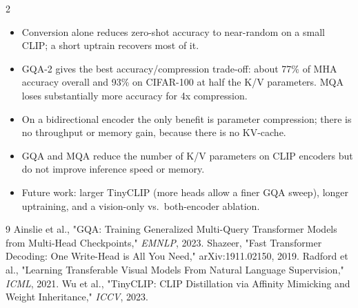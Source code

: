 \documentclass[a0,portrait]{a0poster}
\begin{document}
\begin{multicols}{2}
\begin{itemize}\setlength\itemsep{0pt}\setlength\topsep{0pt}\setlength\parsep{0pt}\setlength\partopsep{0pt}
    \item Conversion alone reduces zero-shot accuracy to near-random on a small CLIP; a short uptrain recovers most of it.
    \item GQA-2 gives the best accuracy/compression trade-off: about 77\% of MHA accuracy overall and 93\% on CIFAR-100 at half the K/V parameters. MQA loses substantially more accuracy for 4x compression.
    \item On a bidirectional encoder the only benefit is parameter compression; there is no throughput or memory gain, because there is no KV-cache.
    \item GQA and MQA reduce the number of K/V parameters on CLIP encoders but do not improve inference speed or memory.
    \item Future work: larger TinyCLIP (more heads allow a finer GQA sweep), longer uptraining, and a vision-only vs.\ both-encoder ablation.
\end{itemize}
\color{Black}


{\tiny\raggedright\setlength{\parskip}{1pt}
\begin{thebibliography}{9}
 Ainslie et al., "GQA: Training Generalized Multi-Query Transformer Models from Multi-Head Checkpoints," \textit{EMNLP}, 2023.
 Shazeer, "Fast Transformer Decoding: One Write-Head is All You Need," arXiv:1911.02150, 2019.
 Radford et al., "Learning Transferable Visual Models From Natural Language Supervision," \textit{ICML}, 2021.
 Wu et al., "TinyCLIP: CLIP Distillation via Affinity Mimicking and Weight Inheritance," \textit{ICCV}, 2023.
\end{thebibliography}
}

\end{multicols}
\end{document}
